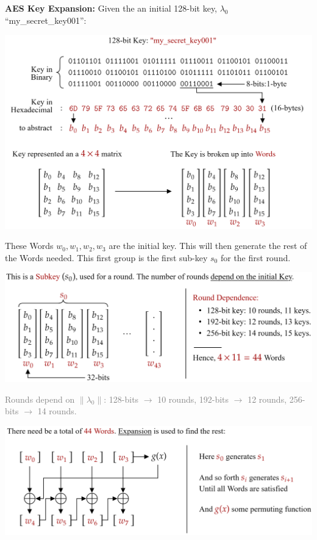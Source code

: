 \noindent
\textbf{AES Key Expansion:} Given the an initial 128-bit key, $\lambda_0$ ``my\_secret\_key001'':\\

\vspace{1em}

\hspace{-3em}
\includegraphics [width=1.1\textwidth]{Sections/sec/enc/aes/input.png}

\vspace{3em}
\noindent
These Words $w_0, w_1, w_2, w_3$ are the initial key. This will then generate the rest of the Words needed.
This first group is the first sub-key $s_0$ for the first round.

\newpage 

\hspace{-3em}
\includegraphics[width=1.1\textwidth]{Sections/sec/enc/aes/subkey.png}

\vspace{1em}
\noindent
\textcolor{gray}{Rounds depend on $\|\lambda_0\|$: 128-bits $\rightarrow$ 10 rounds, 192-bits $\rightarrow$ 12 rounds, 256-bits $\rightarrow$ 14 rounds.}

\vspace{1em}
\hspace{-3em}
\includegraphics[width=1.1\textwidth]{Sections/sec/enc/aes/round_gen.png}

